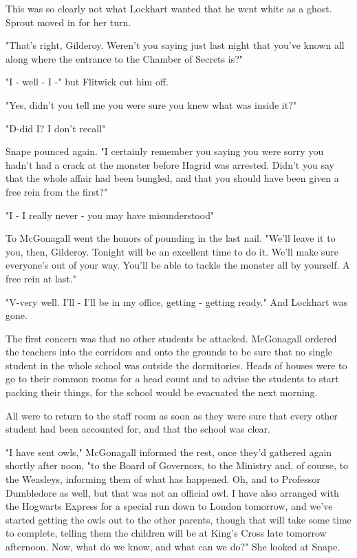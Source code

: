 This was so clearly not what Lockhart wanted that he went white as a ghost. Sprout moved in for her turn.

"That's right, Gilderoy. Weren't you saying just last night that you've known all along where the entrance to the Chamber of Secrets is?"

"I - well - I -" but Flitwick cut him off.

"Yes, didn't you tell me you were sure you knew what was inside it?"

"D-did I? I don't recall{\el}"

Snape pounced again. "I certainly remember you saying you were sorry you hadn't had a crack at the monster before Hagrid was arrested. Didn't you say that the whole affair had been bungled, and that you should have been given a free rein from the first?"

"I - I really never - you may have misunderstood{\el}"

To McGonagall went the honors of pounding in the last nail. "We'll leave it to you, then, Gilderoy. Tonight will be an excellent time to do it. We'll make sure everyone's out of your way. You'll be able to tackle the monster all by yourself. A free rein at last."

"V-very well. I'll - I'll be in my office, getting - getting ready." And Lockhart was gone.

The first concern was that no other students be attacked. McGonagall ordered the teachers into the corridors and onto the grounds to be sure that no single student in the whole school was outside the dormitories. Heads of houses were to go to their common rooms for a head count and to advise the students to start packing their things, for the school would be evacuated the next morning.

All were to return to the staff room as soon as they were sure that every other student had been accounted for, and that the school was clear.

"I have sent owls," McGonagall informed the rest, once they'd gathered again shortly after noon, "to the Board of Governors, to the Ministry and, of course, to the Weasleys, informing them of what has happened. Oh, and to Professor Dumbledore as well, but that was not an official owl. I have also arranged with the Hogwarts Express for a special run down to London tomorrow, and we've started getting the owls out to the other parents, though that will take some time to complete, telling them the children will be at King's Cross late tomorrow afternoon. Now, what do we know, and what can we do?" She looked at Snape.

